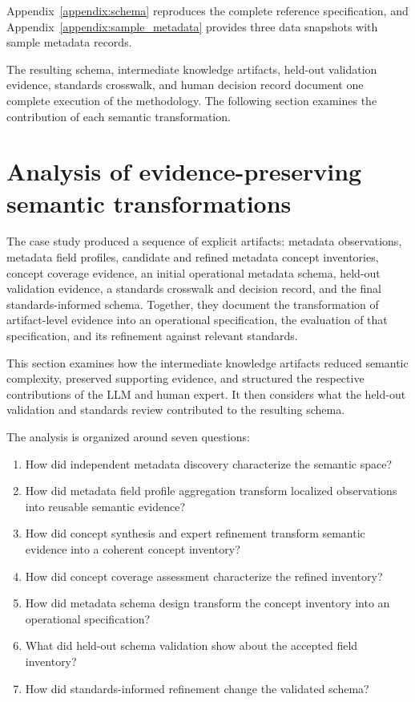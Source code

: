 \documentclass{article}
\begin{document}
Appendix~\ref{appendix:schema} reproduces the complete reference specification, and Appendix~\ref{appendix:sample_metadata} provides three data snapshots with sample metadata records.

The resulting schema, intermediate knowledge artifacts, held-out validation evidence, standards crosswalk, and human decision record document one complete execution of the methodology. The following section examines the contribution of each semantic transformation.

\section{Analysis of evidence-preserving semantic transformations}

The case study produced a sequence of explicit artifacts: metadata observations, metadata field profiles, candidate and refined metadata concept inventories, concept coverage evidence, an initial operational metadata schema, held-out validation evidence, a standards crosswalk and decision record, and the final standards-informed schema. Together, they document the transformation of artifact-level evidence into an operational specification, the evaluation of that specification, and its refinement against relevant standards.

This section examines how the intermediate knowledge artifacts reduced semantic complexity, preserved supporting evidence, and structured the respective contributions of the LLM and human expert. It then considers what the held-out validation and standards review contributed to the resulting schema.

The analysis is organized around seven questions:

\begin{enumerate}
    \item How did independent metadata discovery characterize the semantic space?
    \item How did metadata field profile aggregation transform localized observations into reusable semantic evidence?
    \item How did concept synthesis and expert refinement transform semantic evidence into a coherent concept inventory?
    \item How did concept coverage assessment characterize the refined inventory?
    \item How did metadata schema design transform the concept inventory into an operational specification?
    \item What did held-out schema validation show about the accepted field inventory?
    \item How did standards-informed refinement change the validated schema?
\end{enumerate}
\end{document}
